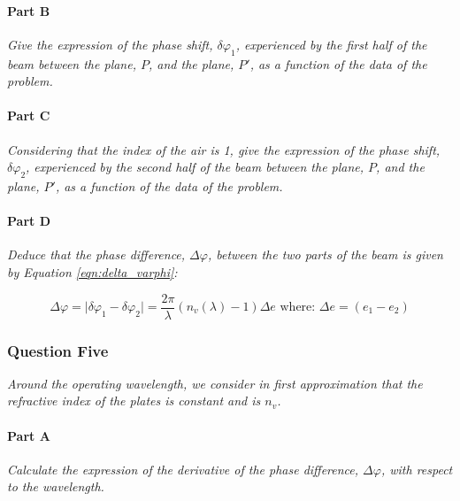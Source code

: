\documentclass[colorlinks,11pt,a4paper,normalphoto,withhyper,ragged2e]{altareport}
\begin{document}
\paragraph{Part B \linebreak}
\textit{Give the expression of the phase shift, $\delta\varphi_1$, experienced by the first half of the beam between the plane, $P$, and the plane, $P'$, as a function of the data of the problem.} \linebreak




\paragraph{Part C \linebreak}
\textit{Considering that the index of the air is 1, give the expression of the phase shift, $\delta\varphi_2$, experienced by the second half of the beam between the plane, $P$, and the plane, $P'$, as a function of the data of the problem.} \linebreak




\paragraph{Part D \linebreak}
\textit{Deduce that the phase difference, $\Delta\varphi$, between the two parts of the beam is given by Equation \ref{eqn:delta_varphi}:} \linebreak

\begin{equation}
	\Delta\varphi = \lvert \delta\varphi_1 - \delta\varphi_2 \rvert = \frac{2 \pi}{\lambda}(n_v(\lambda)-1)\Delta e \text{ where: } \Delta e = (e_1 - e_2)
	\label{eqn:delta_varphi}
\end{equation}




\subsubsection{Question Five}
\textit{Around the operating wavelength, we consider in first approximation that the refractive index of the plates is constant and is $n_v$.} \linebreak


\paragraph{Part A \linebreak}
\textit{Calculate the expression of the derivative of the phase difference, $\Delta\varphi$, with respect to the wavelength.} \linebreak
\end{document}
